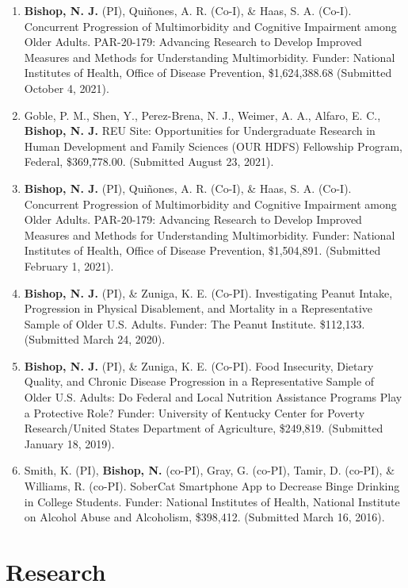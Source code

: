 \documentclass[
]{article}
\begin{document}
\begin{enumerate}
\def\labelenumi{\arabic{enumi}.}
\item
  \textbf{Bishop, N. J.} (PI), Quiñones, A. R. (Co-I), \& Haas, S. A.
  (Co-I). Concurrent Progression of Multimorbidity and Cognitive
  Impairment among Older Adults. PAR-20-179: Advancing Research to
  Develop Improved Measures and Methods for Understanding
  Multimorbidity. Funder: National Institutes of Health, Office of
  Disease Prevention, \$1,624,388.68 (Submitted October 4, 2021).
\item
  Goble, P. M., Shen, Y., Perez-Brena, N. J., Weimer, A. A., Alfaro, E.
  C., \textbf{Bishop, N. J.} REU Site: Opportunities for Undergraduate
  Research in Human Development and Family Sciences (OUR HDFS)
  Fellowship Program, Federal, \$369,778.00. (Submitted August 23,
  2021).
\item
  \textbf{Bishop, N. J.} (PI), Quiñones, A. R. (Co-I), \& Haas, S. A.
  (Co-I). Concurrent Progression of Multimorbidity and Cognitive
  Impairment among Older Adults. PAR-20-179: Advancing Research to
  Develop Improved Measures and Methods for Understanding
  Multimorbidity. Funder: National Institutes of Health, Office of
  Disease Prevention, \$1,504,891. (Submitted February 1, 2021).
\item
  \textbf{Bishop, N. J.} (PI), \& Zuniga, K. E. (Co-PI). Investigating
  Peanut Intake, Progression in Physical Disablement, and Mortality in a
  Representative Sample of Older U.S. Adults. Funder: The Peanut
  Institute. \$112,133. (Submitted March 24, 2020).
\item
  \textbf{Bishop, N. J.} (PI), \& Zuniga, K. E. (Co-PI). Food
  Insecurity, Dietary Quality, and Chronic Disease Progression in a
  Representative Sample of Older U.S. Adults: Do Federal and Local
  Nutrition Assistance Programs Play a Protective Role? Funder:
  University of Kentucky Center for Poverty Research/United States
  Department of Agriculture, \$249,819. (Submitted January 18, 2019).
\item
  Smith, K. (PI), \textbf{Bishop, N.} (co-PI), Gray, G. (co-PI), Tamir,
  D. (co-PI), \& Williams, R. (co-PI). SoberCat Smartphone App to
  Decrease Binge Drinking in College Students. Funder: National
  Institutes of Health, National Institute on Alcohol Abuse and
  Alcoholism, \$398,412. (Submitted March 16, 2016).
\end{enumerate}

\hypertarget{research}{%
\section{\texorpdfstring{\textbf{Research}}{Research}}\label{research}}
\end{document}
